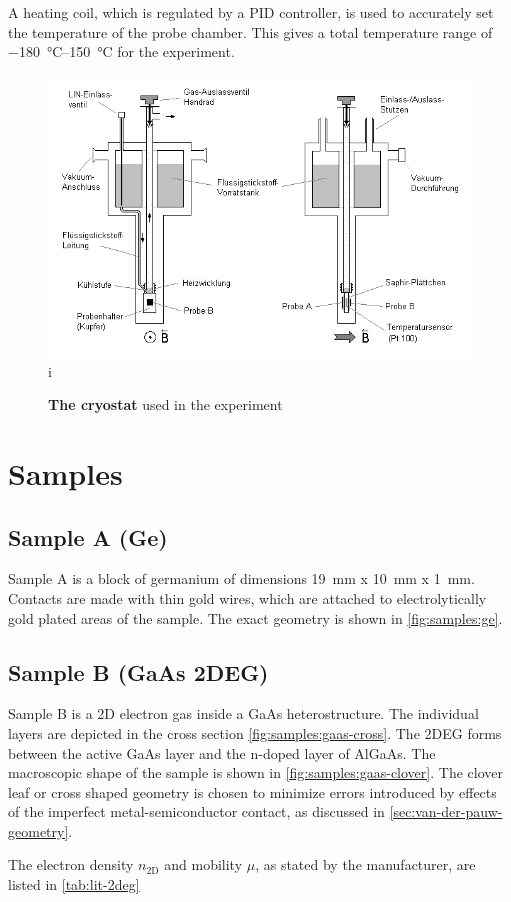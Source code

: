 A heating coil, which is regulated by a PID controller, is used to accurately set the temperature of the probe chamber.
This gives a total temperature range of \SIrange{-180}{150}{\celsius} for the experiment.

\begin{figure}
	\centering
	\includegraphics[width=.7\textwidth]{./img/cryostat.png}i
	\caption[Cryostat]{\textbf{The cryostat} used in the experiment}
	\label{fig:cryostat}
\end{figure}

\section{Samples}
\subsection{Sample A (Ge)}
Sample A is a block of germanium of dimensions \SI{19}{\mm} x \SI{10}{\mm} x \SI{1}{\mm}.
Contacts are made with thin gold wires, which are attached to electrolytically gold plated areas of the sample.
The exact geometry is shown in \autoref{fig:samples:ge}.

\subsection{Sample B (GaAs 2DEG)}
Sample B is a 2D electron gas inside a GaAs heterostructure.
The individual layers are depicted in the cross section \autoref{fig:samples:gaas-cross}.
The 2DEG forms between the active GaAs layer and the n-doped layer of AlGaAs.
The macroscopic shape of the sample is shown in \autoref{fig:samples:gaas-clover}.
The clover leaf or cross shaped geometry is chosen to minimize errors introduced by effects of the imperfect metal-semiconductor contact, as discussed in \autoref{sec:van-der-pauw-geometry}.

The electron density $n_\text{2D}$ and mobility $\mu$, as stated by the manufacturer, are listed in \autoref{tab:lit-2deg}

